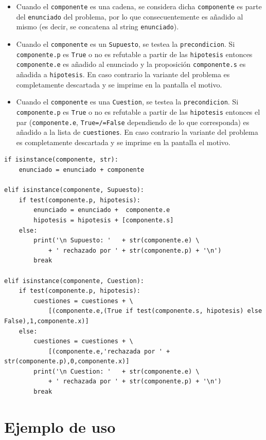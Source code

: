 \documentclass[10pt,a4paper]{report}
\begin{document}
\label{Tratamiento en función del tipo de componente}
\begin{itemize}
\item Cuando el \texttt{componente} es una cadena, se considera dicha \texttt{componente} es parte del \texttt{enunciado} del problema, por lo que consecuentemente es añadido al mismo (es decir, se concatena al string \texttt{enunciado}).
\item Cuando el \texttt{componente} es un \texttt{Supuesto}, se testea la \texttt{precondicion}.
Si \texttt{componente.p} es \texttt{True} o no es refutable a partir de las \texttt{hipotesis} entonces \texttt{componente.e} es añadido al enunciado y la proposición \texttt{componente.s} es añadida a \texttt{hipotesis}.
En caso contrario la variante del problema es completamente descartada y se imprime en la pantalla el motivo.
\item Cuando el \texttt{componente} es una \texttt{Cuestion}, se testea la  \texttt{precondicion}.
Si \texttt{componente.p} es \texttt{True} o no es refutable a partir de las \texttt{hipotesis} entonces el par (\texttt{componente.e}, \texttt{True=/=False} dependiendo de lo que corresponda) es añadido a la lista de \texttt{cuestiones}.
En caso contrario la variante del problema es completamente descartada y se imprime en la pantalla el motivo.
\end{itemize}

\label{Tratamiento en función del tipo de componente}
\begin{verbatim}
if isinstance(componente, str):
    enunciado = enunciado + componente

elif isinstance(componente, Supuesto):
    if test(componente.p, hipotesis):
        enunciado = enunciado +  componente.e
        hipotesis = hipotesis + [componente.s]
    else:
        print('\n Supuesto: '   + str(componente.e) \
            + ' rechazado por ' + str(componente.p) + '\n')
        break

elif isinstance(componente, Cuestion):
    if test(componente.p, hipotesis):
        cuestiones = cuestiones + \
            [(componente.e,(True if test(componente.s, hipotesis) else False),1,componente.x)]
    else:
        cuestiones = cuestiones + \
            [(componente.e,'rechazada por ' + str(componente.p),0,componente.x)]
        print('\n Cuestion: '   + str(componente.e) \
            + ' rechazada por ' + str(componente.p) + '\n')
        break
\end{verbatim}
\section{Ejemplo de uso}
\label{sec:org5a5e58d}
\end{document}
